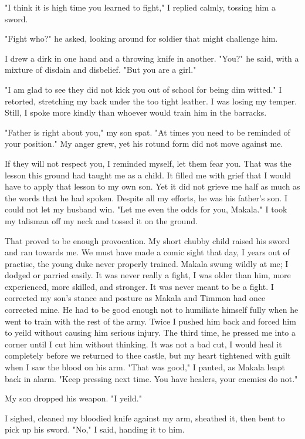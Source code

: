 \documentclass{article}
\begin{document}
"I think it is high time you learned to fight," I replied calmly, tossing him a sword. 

"Fight who?" he asked, looking around for soldier that might challenge him.

I drew a dirk in one hand and a throwing knife in another. "You?" he said, with a mixture of disdain and disbelief. "But you are a girl."

"I am glad to see they did not kick you out of school for being dim witted." I retorted, stretching my back under the too tight leather. I was losing my temper. Still, I spoke more kindly than whoever would train him in the barracks. 

"Father is right about you," my son spat. "At times you need to be reminded of your position." My anger grew, yet his rotund form did not move against me.

If they will not respect you, I reminded myself, let them fear you. That was the lesson this ground had taught me as a child. It filled me with grief that I would have to apply that lesson to my own son. Yet it did not grieve me half as much as the words that he had spoken. Despite all my efforts, he was his father's son. I could not let my husband win. "Let me even the odds for you, Makala." I took my talisman off my neck and tossed it on the ground. 

That proved to be enough provocation. My short chubby child raised his sword and ran towards me. We must have made a comic sight that day, I years out of practise, the young duke never properly trained. Makala swung wildly at me; I dodged or parried easily. It was never really a fight, I was older than him, more experienced, more skilled, and stronger. It was never meant to be a fight. I corrected my son's stance and posture as Makala and Timmon had once corrected mine. He had to be good enough not to humiliate himself fully when he went to train with the rest of the army. Twice I pushed him back and forced him to yeild without causing him serious injury. The third time, he pressed me into a corner until I cut him without thinking. It was not a bad cut, I would heal it completely before we returned to thee castle, but my heart tightened with guilt when I saw the blood on his arm. "That was good," I panted, as Makala leapt back in alarm. "Keep pressing next time. You have healers, your enemies do not."

My son dropped his weapon. "I yeild." 

I sighed, cleaned my bloodied knife against my arm, sheathed it, then bent to pick up his sword. "No," I said, handing it to him. 
\end{document}
